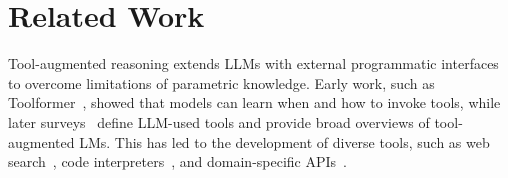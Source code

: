 \documentclass[11pt]{article}
\def \task{\textsc{TIM}\xspace}
\begin{document}


\section{Related Work}

Tool-augmented reasoning extends LLMs with external programmatic interfaces to overcome limitations of parametric knowledge. Early work, such as Toolformer~\citep{toolformer}, showed that models can learn when and how to invoke tools, while later surveys~\citep{wang2024toolsanywaysurveylanguage, gou2024tora} define LLM-used tools and provide broad overviews of tool-augmented LMs. This has led to the development of diverse tools, such as web search~\citep{asai2024selfrag, 10.5555/3666122.3668004}, code interpreters~\citep{POTprompting, gao2022pal}, and domain-specific APIs~\citep{Qin2023ToolLLMFL}.
\end{document}

